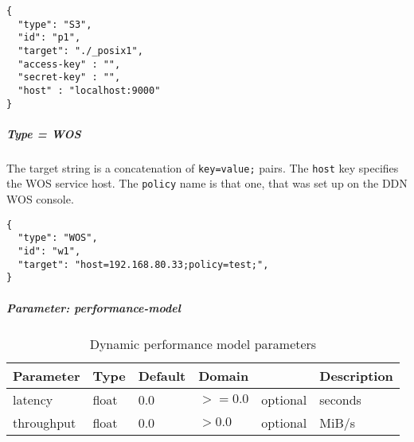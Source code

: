 \begin{lstlisting}
{
  "type": "S3",
  "id": "p1",
  "target": "./_posix1",
  "access-key" : "",
  "secret-key" : "",
  "host" : "localhost:9000"
}
\end{lstlisting}
\FloatBarrier
\vspace{\gapsize}


\subparagraph{Type = WOS}
The target string is a concatenation of \lstinline|key=value;| pairs.
The \lstinline|host| key specifies the WOS service host.
The \lstinline|policy| name is that one, that was set up on the DDN WOS console.

\begin{lstlisting}
{
  "type": "WOS",
  "id": "w1",
  "target": "host=192.168.80.33;policy=test;",
}
\end{lstlisting}
\FloatBarrier
\vspace{\gapsize}


\subparagraph{Parameter: performance-model}

\begin{preserve}
\begin{table}[!ht]
  \begin{center}
    \begin{tabularx}{\textwidth}{lllllX}
      Parameter  & Type  & Default & Domain &          & Description \\ 
      \hline
      latency    & float & 0.0     & $>=0.0$  & optional & seconds     \\ 
      throughput & float & 0.0     & $>0.0$   & optional & MiB/s       \\ 
    \end{tabularx}
  \end{center}
  \caption{Dynamic performance model parameters}%
  \label{tab:dyn_perf_model_conf_params}
\end{table}
\end{preserve}


